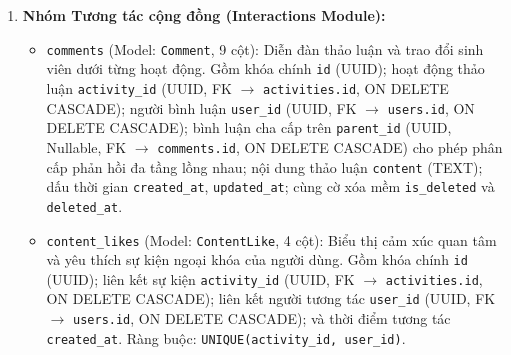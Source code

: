 \begin{enumerate}
    \item \textbf{Nhóm Tương tác cộng đồng (Interactions Module):}
    \begin{itemize}
        \item \texttt{comments} (Model: \texttt{Comment}, 9 cột): Diễn đàn thảo luận và trao đổi sinh viên dưới từng hoạt động. Gồm khóa chính \texttt{id} (UUID); hoạt động thảo luận \texttt{activity\_id} (UUID, FK $\rightarrow$ \texttt{activities.id}, ON DELETE CASCADE); người bình luận \texttt{user\_id} (UUID, FK $\rightarrow$ \texttt{users.id}, ON DELETE CASCADE); bình luận cha cấp trên \texttt{parent\_id} (UUID, Nullable, FK $\rightarrow$ \texttt{comments.id}, ON DELETE CASCADE) cho phép phân cấp phản hồi đa tầng lồng nhau; nội dung thảo luận \texttt{content} (TEXT); dấu thời gian \texttt{created\_at}, \texttt{updated\_at}; cùng cờ xóa mềm \texttt{is\_deleted} và \texttt{deleted\_at}.
        \item \texttt{content\_likes} (Model: \texttt{ContentLike}, 4 cột): Biểu thị cảm xúc quan tâm và yêu thích sự kiện ngoại khóa của người dùng. Gồm khóa chính \texttt{id} (UUID); liên kết sự kiện \texttt{activity\_id} (UUID, FK $\rightarrow$ \texttt{activities.id}, ON DELETE CASCADE); liên kết người tương tác \texttt{user\_id} (UUID, FK $\rightarrow$ \texttt{users.id}, ON DELETE CASCADE); và thời điểm tương tác \texttt{created\_at}. Ràng buộc: \texttt{UNIQUE(activity\_id, user\_id)}.
    \end{itemize}


\end{enumerate}
